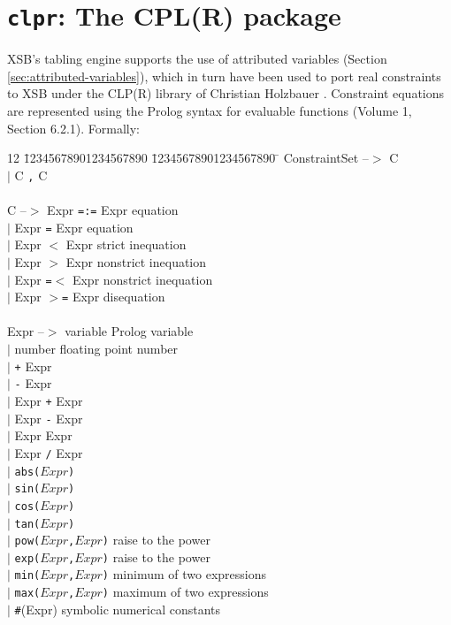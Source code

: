 \chapter{{\tt clpr}: The CPL(R) package}

XSB's tabling engine supports the use of attributed variables (Section
\ref{sec:attributed-variables}), which in turn have been used to port
real constraints to XSB under the CLP(R) library of Christian
Holzbauer \cite{Holz95}.  Constraint equations are represented using
the Prolog syntax for evaluable functions (Volume 1, Section
6.2.1).  Formally:

{\it
\begin{tabbing}
12 \= 12345678901234567890 \= 12345678901234567890 \=	\kill
\> ConstraintSet --$>$   \>  C     \\
\> \>                      $|$ C {\tt ,} C   \\
\\
\> C --$>$ \> Expr {\tt =:=} Expr \> {\rm equation} \\
\>    \> $|$ Expr {\tt =} Expr \> {\rm equation} \\
\>    \> $|$ Expr {\tt $<$} Expr \> {\rm strict inequation} \\
\>    \> $|$ Expr {\tt $>$} Expr \> {\rm nonstrict inequation} \\
\>    \> $|$ Expr {\tt =$<$} Expr \> {\rm nonstrict inequation} \\
\>    \> $|$ Expr {\tt $>$=} Expr \> {\rm disequation} \\
\\
\> Expr --$>$  \> variable \> {\rm Prolog variable} \\
\> \> $|$ number \> {\rm floating point number} \\
\> \> $|$ {\tt +} Expr \\
\> \> $|$ {\tt -} Expr \\
\> \> $|$ Expr {\tt +}  Expr \\
\> \> $|$ Expr {\tt -} Expr \\
\> \> $|$ Expr {\tt *} Expr \\
\> \> $|$ Expr {\tt /} Expr \\
\> \> $|$ {\tt abs($Expr$)} \\
\> \> $|$ {\tt sin($Expr$)} \\
\> \> $|$ {\tt cos($Expr$)} \\
\> \> $|$ {\tt tan($Expr$)} \\
\> \> $|$ {\tt pow($Expr$,$Expr$)} \> {\rm raise to the power} \\
\> \> $|$ {\tt exp($Expr$,$Expr$)} \> {\rm raise to the power} \\
\> \> $|$ {\tt min($Expr$,$Expr$)} \> {\rm minimum of two expressions} \\
\> \> $|$ {\tt max($Expr$,$Expr$)} \> {\rm maximum of two expressions} \\
\> \> $|$ \verb|#|(Expr) \> {\rm symbolic numerical constants} 
\end{tabbing}
}

